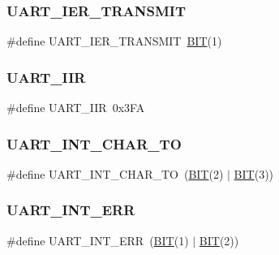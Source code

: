 \subsubsection{\texorpdfstring{U\+A\+R\+T\+\_\+\+I\+E\+R\+\_\+\+T\+R\+A\+N\+S\+M\+IT}{UART\_IER\_TRANSMIT}}
{\footnotesize\ttfamily \#define U\+A\+R\+T\+\_\+\+I\+E\+R\+\_\+\+T\+R\+A\+N\+S\+M\+IT~\mbox{\hyperlink{group__uart_ga3a8ea58898cb58fc96013383d39f482c}{B\+IT}}(1)}

\mbox{\label{group__uart_ga16add7e6b9f91a6698c5910704111b68}} 
\subsubsection{\texorpdfstring{U\+A\+R\+T\+\_\+\+I\+IR}{UART\_IIR}}
{\footnotesize\ttfamily \#define U\+A\+R\+T\+\_\+\+I\+IR~0x3\+FA}

\mbox{\label{group__uart_ga9fff1346e91137f4c23ef9f4573b6873}} 
\subsubsection{\texorpdfstring{U\+A\+R\+T\+\_\+\+I\+N\+T\+\_\+\+C\+H\+A\+R\+\_\+\+TO}{UART\_INT\_CHAR\_TO}}
{\footnotesize\ttfamily \#define U\+A\+R\+T\+\_\+\+I\+N\+T\+\_\+\+C\+H\+A\+R\+\_\+\+TO~(\mbox{\hyperlink{group__uart_ga3a8ea58898cb58fc96013383d39f482c}{B\+IT}}(2) $\vert$ \mbox{\hyperlink{group__uart_ga3a8ea58898cb58fc96013383d39f482c}{B\+IT}}(3))}

\mbox{\label{group__uart_ga4eeaa2e20511294d6f6712f51225ddde}} 
\subsubsection{\texorpdfstring{U\+A\+R\+T\+\_\+\+I\+N\+T\+\_\+\+E\+RR}{UART\_INT\_ERR}}
{\footnotesize\ttfamily \#define U\+A\+R\+T\+\_\+\+I\+N\+T\+\_\+\+E\+RR~(\mbox{\hyperlink{group__uart_ga3a8ea58898cb58fc96013383d39f482c}{B\+IT}}(1) $\vert$ \mbox{\hyperlink{group__uart_ga3a8ea58898cb58fc96013383d39f482c}{B\+IT}}(2))}

